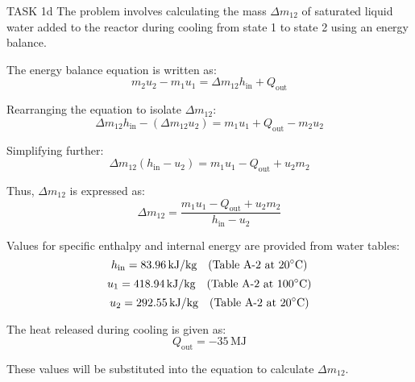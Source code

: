TASK 1d  
The problem involves calculating the mass \( \Delta m_{12} \) of saturated liquid water added to the reactor during cooling from state 1 to state 2 using an energy balance.  

The energy balance equation is written as:  
\[
m_2 u_2 - m_1 u_1 = \Delta m_{12} h_{\text{in}} + Q_{\text{out}}
\]  

Rearranging the equation to isolate \( \Delta m_{12} \):  
\[
\Delta m_{12} h_{\text{in}} - (\Delta m_{12} u_2) = m_1 u_1 + Q_{\text{out}} - m_2 u_2
\]  

Simplifying further:  
\[
\Delta m_{12} (h_{\text{in}} - u_2) = m_1 u_1 - Q_{\text{out}} + u_2 m_2
\]  

Thus, \( \Delta m_{12} \) is expressed as:  
\[
\Delta m_{12} = \frac{m_1 u_1 - Q_{\text{out}} + u_2 m_2}{h_{\text{in}} - u_2}
\]  

Values for specific enthalpy and internal energy are provided from water tables:  
\[
h_{\text{in}} = 83.96 \, \text{kJ/kg} \quad \text{(Table A-2 at \( 20^\circ\text{C} \))}  
\]  
\[
u_1 = 418.94 \, \text{kJ/kg} \quad \text{(Table A-2 at \( 100^\circ\text{C} \))}  
\]  
\[
u_2 = 292.55 \, \text{kJ/kg} \quad \text{(Table A-2 at \( 20^\circ\text{C} \))}  
\]  

The heat released during cooling is given as:  
\[
Q_{\text{out}} = -35 \, \text{MJ}
\]  

These values will be substituted into the equation to calculate \( \Delta m_{12} \).